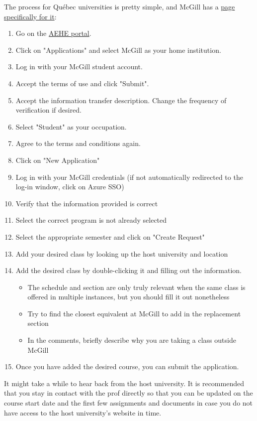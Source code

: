 The process for Québec universities is pretty simple, and McGill has a \href{https://www.mcgill.ca/transfercredit/iut}{page specifically for it}:
\begin{enumerate}
    \item Go on the \href{https://aehe.bci-qc.ca/en}{AEHE portal}.
    \item Click on "Applications" and select McGill as your home institution.
    \item Log in with your McGill student account.
    \item Accept the terms of use and click "Submit".
    \item Accept the information transfer description. Change the frequency of verification if desired.
    \item Select "Student" as your occupation.
    \item Agree to the terms and conditions again.
    \item Click on "New Application"
    \item Log in with your McGill credentials (if not automatically redirected to the log-in window, click on Azure SSO)
    \item Verify that the information provided is correct
    \item Select the correct program is not already selected
    \item Select the appropriate semester and click on "Create Request"
    \item Add your desired class by looking up the host university and location
    \item Add the desired class by double-clicking it and filling out the information. 
    \begin{itemize}
        \item The schedule and section are only truly relevant when the same class is offered in multiple instances, but you should fill it out nonetheless
        \item Try to find the closest equivalent at McGill to add in the replacement section
        \item In the comments, briefly describe why you are taking a class outside McGill
    \end{itemize} 
    \item Once you have added the desired course, you can submit the application.
\end{enumerate}
It might take a while to hear back from the host university. It is recommended that you stay in contact with the prof directly so that you can be updated on the course start date and the first few assignments and documents in case you do not have access to the host university's website in time. 

